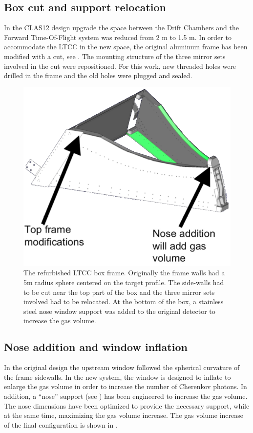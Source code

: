 \subsection{Box cut and support relocation }

In the CLAS12 design upgrade the space between the Drift Chambers and the Forward Time-Of-Flight system was reduced from 2 m to 1.5 m.
In order to accommodate the LTCC in the new space, the original aluminum frame has been modified with a cut, see .
The mounting structure of the three mirror sets involved in the cut were repositioned. For this work, new threaded holes were
drilled in the frame and the old holes were plugged and sealed.

\begin{figure}
	\centering
	\includegraphics[width=1.0\columnwidth, height=0.75\columnwidth]{img/boxCut.png}
	\caption{The refurbished LTCC box frame. Originally the frame walls had a 5m radius sphere centered on the target profile.
            The side-walls had to be cut near the top part of the box and the three mirror sets involved had to be relocated.
				At the bottom of the box, a stainless steel nose window support was added to the original detector to increase the gas volume.}
	\label{fig:boxCut}
\end{figure}


\subsection{Nose addition and window inflation}

In the original design the upstream window followed the spherical curvature of the frame sidewalls. In the new system, the window is
designed to inflate to enlarge the gas volume in order to increase the number of Cherenkov photons. In addition, a ``nose''
support (see ) has been engineered to increase the gas volume.
The nose dimensions have been optimized to provide the necessary support, while at the same time, maximizing the gas volume increase.
The gas volume increase of the final configuration is shown in .



